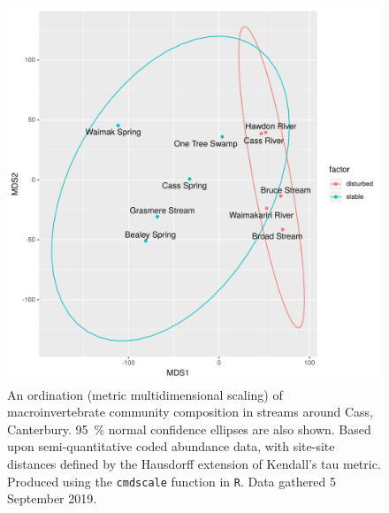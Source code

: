 \documentclass[a4paper,10pt]{article}
\newcommand\datadate{5 September 2019} %
\begin{document}
\begin{figure}[p]
	\centering
	\includegraphics[width=\textwidth]{site-ordination}
	\caption[Site ordination]{ %
		An ordination (metric multidimensional scaling) of macroinvertebrate community composition in streams around Cass, Canterbury.
		\SI{95}{\percent} normal confidence ellipses are also shown.
		Based upon semi-quantitative coded abundance data, with site-site distances defined by the Hausdorff extension of Kendall's tau metric.
		Produced using the \texttt{cmdscale} function in \texttt{R}.
		Data gathered {\datadate}.
	}\label{fig:site-ordination}
\end{figure}

\end{document}
